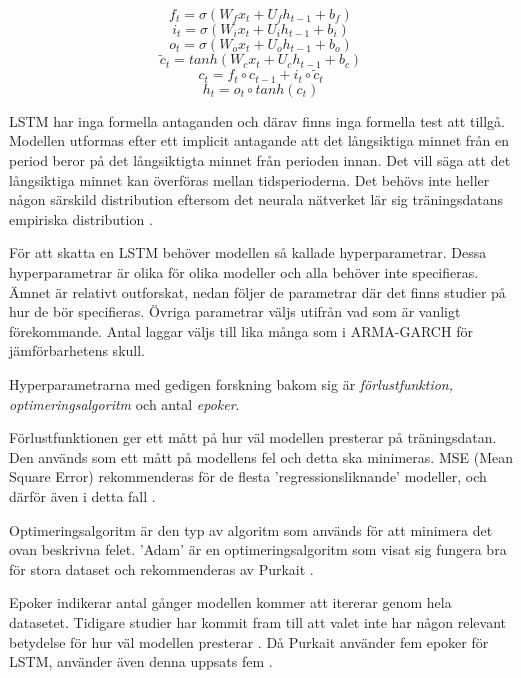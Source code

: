 \documentclass[11pt]{article}
\numberwithin{equation}{section}
\numberwithin{table}{section}
\numberwithin{figure}{section}
\begin{document}
\begin{equation}f_t = \sigma(W_f x_t + U_f h_{t-1} + b_f)\end{equation}
\begin{equation}i_t = \sigma(W_i x_t + U_i h_{t-1} + b_i)\end{equation}
\begin{equation}o_t = \sigma(W_o x_t + U_o h_{t-1} + b_o)\end{equation}
\begin{equation}\tilde{c}_t = tanh(W_c x_t + U_c h_{t-1} + b_c)\end{equation}
\begin{equation}c_t= f_t \circ c_{t-1} + i_t \circ \tilde{c}_t\end{equation}
\begin{equation}h_t= o_t \circ tanh(c_t)\end{equation}

LSTM har inga formella antaganden och därav finns inga formella test att tillgå. Modellen utformas efter ett implicit antagande att det långsiktiga minnet från en period beror på det långsiktigta minnet från perioden innan. Det vill säga att det långsiktiga minnet kan överföras mellan tidsperioderna. Det behövs inte heller någon särskild distribution eftersom det neurala nätverket lär sig träningsdatans empiriska distribution \parencite[][,s.478-559]{purkait2019hands}.

För att skatta en LSTM behöver modellen så kallade hyperparametrar. Dessa hyperparametrar är olika för olika modeller och alla behöver inte specifieras. Ämnet är relativt outforskat, nedan följer de parametrar där det finns studier på hur de bör specifieras. Övriga parametrar väljs utifrån vad som är vanligt förekommande. Antal laggar väljs till lika många som i ARMA-GARCH för jämförbarhetens skull.

Hyperparametrarna med gedigen forskning bakom sig är \textit{förlustfunktion, optimeringsalgoritm} och antal \textit{epoker}.

Förlustfunktionen ger ett mått på hur väl modellen presterar på träningsdatan. Den används som ett mått på modellens fel och detta ska minimeras. MSE (Mean Square Error) rekommenderas för de flesta 'regressionsliknande' modeller, och därför även i detta fall \parencite[][,s.178 ff.]{purkait2019hands}. \par
Optimeringsalgoritm är den typ av algoritm som används för att minimera det ovan beskrivna felet. 'Adam' är en optimeringsalgoritm som visat sig fungera bra för stora dataset och rekommenderas av Purkait \parencite*[][,s.178 ff.]{purkait2019hands}. \par
Epoker indikerar antal gånger modellen kommer att itererar genom hela datasetet. Tidigare studier har kommit fram till att valet inte har någon relevant betydelse för hur väl modellen presterar \parencite{siaminamini2018forecasting}. Då Purkait använder fem epoker för LSTM, använder även denna uppsats fem \parencite[][,s.178 ff.]{purkait2019hands}. \par
\end{document}
